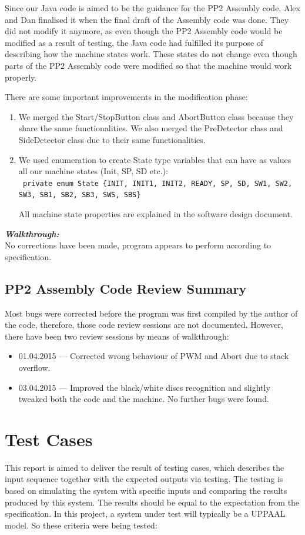 \documentclass[a4paper,oneside,11pt]{report}
\begin{document}
Since our Java code is aimed to be the guidance for the PP2 Assembly code, Alex and Dan finalised it when the final draft of the Assembly code was done. They did not modify it anymore, as even though the PP2 Assembly code would be modified as a result of testing, the Java code had fulfilled its purpose of describing how the machine states work. These states do not change even though parts of the PP2 Assembly code were modified so that the machine would work properly.

There are some important improvements in the modification phase:
\begin{enumerate}
\item We merged the Start/StopButton class and AbortButton class because they share the same functionalities. We also merged the PreDetector class and SideDetector class due to their same functionalities.
\item We used enumeration to create State type variables that can have as values all our machine states (Init, SP, SD etc.):\\
\texttt{
private enum State \{INIT, INIT1, INIT2, READY, SP, SD, SW1, SW2,\\
SW3, SB1, SB2, SB3, SWS, SBS\}
}

All machine state properties are explained in the software design document.
\end{enumerate}

\textbf{\textit{Walkthrough:}}\\
No corrections have been made, program appears to perform according to specification.

\subsection{PP2 Assembly Code Review Summary}
Most bugs were corrected before the program was first compiled by the author of the code, therefore, those code review sessions are not documented. However, there have been two review sessions by means of walkthrough:
\begin{itemize}
\item 01.04.2015 --- Corrected wrong behaviour of PWM and Abort due to stack overflow.
\item 03.04.2015 --- Improved the black/white discs recognition and slightly tweaked both the code and the machine. No further bugs were found.
\end{itemize}

\section{Test Cases}
This report is aimed to deliver the result of testing cases, which describes the input sequence together with the expected outputs via testing. The testing is based on simulating the system with specific inputs and comparing the results produced by this system. The results should be equal to the expectation from the specification. In this project, a system under test will typically be a UPPAAL model.
So these criteria were being tested:
\end{document}
